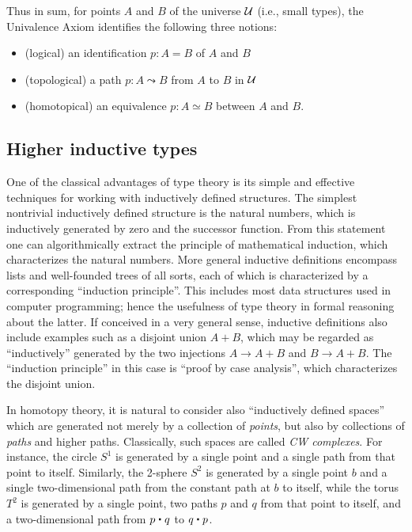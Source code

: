 Thus in sum, for points $A$ and $B$ of the universe $\mathcal{U}$ (i.e., small types), the Univalence Axiom identifies the following three notions:
\begin{itemize}
\item (logical) an identification $p:A=B$ of $A$ and $B$
\item (topological) a path $p:A \leadsto B$ from $A$ to $B$ in $\mathcal{U}$
\item (homotopical) an equivalence $p:A\simeq B$ between $A$ and $B$.
\end{itemize}


\subsection*{Higher inductive types}

One of the classical advantages of type theory is its simple and effective techniques for working with inductively defined structures.
The simplest nontrivial inductively defined structure is the natural numbers, which is inductively generated by zero and the successor function.
From this statement one can algorithmically extract the principle of mathematical induction, which characterizes the natural numbers.
More general inductive definitions encompass lists and well-founded trees of all sorts, each of which is characterized by a corresponding ``induction principle''.
This includes most data structures used in computer programming; hence the usefulness of type theory in formal reasoning about the latter.
If conceived in a very general sense, inductive definitions also include examples such as a disjoint union $A+B$, which may be regarded as ``inductively'' generated by the two injections $A\to A+B$ and $B\to A+B$.
The ``induction principle'' in this case is ``proof by case analysis'', which characterizes the disjoint union.

In homotopy theory, it is natural to consider also ``inductively defined spaces'' which are generated not merely by a collection of \emph{points}, but also by collections of \emph{paths} and higher paths.
Classically, such spaces are called \emph{CW complexes}.
For instance, the circle $S^1$ is generated by a single point and a single path from that point to itself.
Similarly, the 2-sphere $S^2$ is generated by a single point $b$ and a single two-dimensional path from the constant path at $b$ to itself, while the torus $T^2$ is generated by a single point, two paths $p$ and $q$ from that point to itself, and a two-dimensional path from $p\ct q$ to $q\ct p$.

